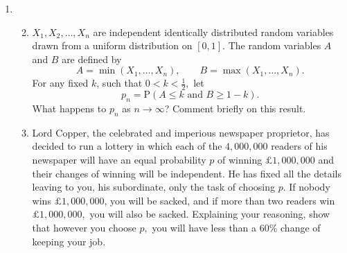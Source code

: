 \documentclass[a4, 11pt]{report}
\newlength{\qspace}
\newcounter{qnumber}
\newenvironment{question}%
 {\vspace{\qspace}
  \begin{enumerate}[\bfseries 1\quad][10]%
    \setcounter{enumi}{\value{qnumber}}%
    \item%
 }
{
  \end{enumerate}
  \filbreak
  \stepcounter{qnumber}
 }
\newenvironment{questionparts}[1][1]%
 {
  \begin{enumerate}[\bfseries (i)]%
    \setcounter{enumii}{#1}
    \addtocounter{enumii}{-1}
    \setlength{\itemsep}{5mm}
    \setlength{\parskip}{8pt}
 }
 {
  \end{enumerate}
 }
\begin{document}
\begin{question}
\begin{questionparts} \item $X_{1},X_{2},\ldots,X_{n}$ are independent
identically distributed random variables drawn from a uniform distribution
on $[0,1].$ The random variables $A$ and $B$ are defined by 
\[
A=\min(X_{1},\ldots,X_{n}),\qquad B=\max(X_{1},\ldots,X_{n}).
\]
For any fixed $k$, such that $0<k<\frac{1}{2},$ let 
\[
p_{n}=\mathrm{P}(A\leqslant k\mbox{ and }B\geqslant1-k).
\]
What happens to $p_{n}$ as $n\rightarrow\infty$? Comment briefly
on this result. 


\item Lord Copper, the celebrated and imperious newspaper proprietor,
has decided to run a lottery in which each of the $4,000,000$ readers
of his newspaper will have an equal probability $p$ of winning $\pounds 1,000,000$
and their changes of winning will be independent. He has fixed all
the details leaving to you, his subordinate, only the task of choosing
$p$. If nobody wins $\pounds 1,000,000$, you will be sacked, and
if more than two readers win $\pounds 1,000,000,$ you will also be
sacked. Explaining your reasoning, show that however you choose $p,$
you will have less than a 60\% change of keeping your job. \end{questionparts}
\end{question}
\end{document}

